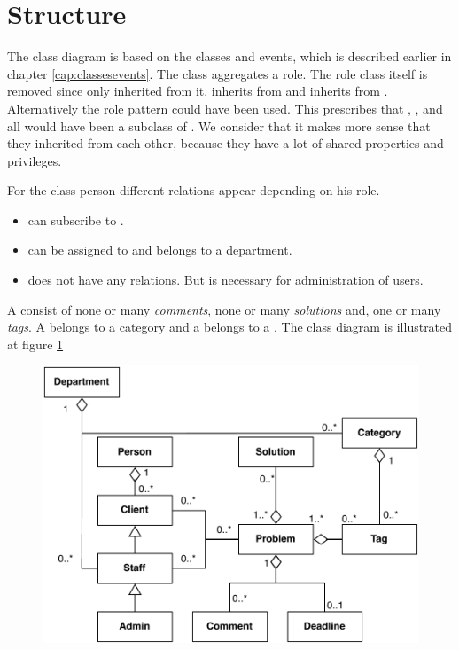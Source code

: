 \section{Structure}
\label{sec:problem_structure}
The class diagram is based on the classes and events, which is described earlier in chapter \ref{cap:classesevents}. The class  aggregates a role. The role class itself is removed since only \class{\client[]} inherited from it. \class{\staff[]} inherits from \class{\client[]} and \class{\admin[]} inherits from \cl{\staff[]}. Alternatively the role pattern could have been used. This prescribes that \class{\client[]}, \class{\staff[]}, and \class{\admin[]} all would have been a subclass of \textit{}  \cite[p. 80]{roedeaalborg}. We consider that it makes more sense that they inherited from each other, because they have a lot of shared properties and privileges.

For the class person different relations appear depending on his role. 
\begin{itemize}
\item {} can subscribe to .
\item \class{\staff[]} can be assigned to  and \class{\staff[]} belongs to a department. 
\item \class{\admin[]} does not have any relations. But is necessary for administration of users.  
\end{itemize}

A \problem[] consist of none or many \textit{comments}, none or many \textit{solutions} and, one or many \textit{tags}. A  belongs to a category and a  belongs to a .  The class diagram is illustrated at figure \ref{fig:pdaclassdiagram}

\begin{figure}
\begin{center}
\includegraphics[scale=0.6]{input/problem_domain_analysis/newest_class_diagram.pdf}
\label{fig:pdaclassdiagram}
\end{center}
\end{figure}